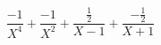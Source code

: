 \begin{displaymath}
 \frac{-1}{X^4}+ \frac{-1}{X^2}+\frac{\frac{1}{2}}{X-1}+\frac{-\frac{1}{2}}{X+1}
\end{displaymath}

